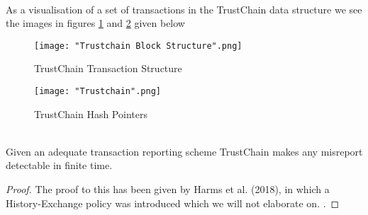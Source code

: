\begin{example}[]\ \\
\noindent{}As a visualisation of a set of transactions in the TrustChain data structure we see the images in figures \ref{fig:Trustchain Transaction Structure} and \ref{fig:Trustchain Hash Pointers} given below \vspace{1em}\\
\label{ex:TrustChain Transactions}
\begin{figure}[H]
\begin{center}
\texttt{[image: "Trustchain Block Structure".png]}
\caption{TrustChain Transaction Structure \cite{TrustChain: A Sybil-resistant scalable blockchain}}
\label{fig:Trustchain Transaction Structure}
\end{center}
\end{figure}


\begin{figure}[H]
\begin{center}
\texttt{[image: "Trustchain".png]}
\caption{TrustChain Hash Pointers \cite{TrustChain: A Sybil-resistant scalable blockchain}}
\label{fig:Trustchain Hash Pointers}
\end{center}
\end{figure}
\end{example}


\begin{theorem}[]\ \\
\label{th:Trustchain makes misreports detectable in finite time}
\noindent{}Given an adequate transaction reporting scheme TrustChain makes any misreport detectable in finite time.
\end{theorem}
\begin{proof}
\noindent{}The proof to this has been given by Harms et al. (2018), in which a History-Exchange policy was introduced which we will not elaborate on. \cite{Creating Trust through Verification of Interaction Records}.
\end{proof}


